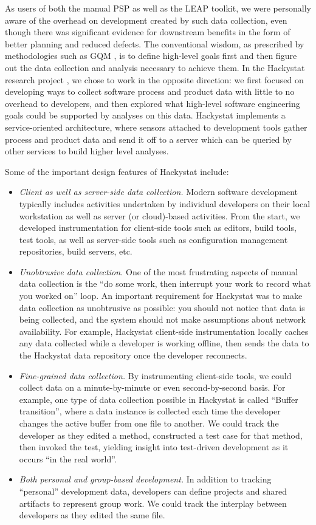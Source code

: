 \documentclass[]{article}
\begin{document}
As users of both the manual PSP as well as the LEAP toolkit, we were personally aware of
the overhead on development created by such data collection, even though there was
significant evidence for downstream benefits in the form of better planning and reduced
defects. The conventional wisdom, as prescribed by methodologies such as GQM
\cite{Basili94gqm}, is to define high-level goals first and then figure out the data
collection and analysis necessary to achieve them.  In the Hackystat research project
\cite{csdl2-02-07}, we chose to work in the opposite direction: we first focused on
developing ways to collect software process and product data with little to no overhead to
developers, and then explored what high-level software engineering goals could be
supported by analyses on this data. Hackystat implements a service-oriented architecture,
where sensors attached to development tools gather process and product data and send it
off to a server which can be queried by other services to build higher level analyses. 

Some of the important design features of Hackystat include:
\begin{itemize}
\item {\em Client as well as server-side data collection.}  Modern software development
  typically includes activities undertaken by individual developers on their local
  workstation as well as server (or cloud)-based activities. From the start, we developed
  instrumentation for client-side tools such as editors, build tools, test tools, as well
  as server-side tools such as configuration management repositories, build servers, etc.
\item {\em Unobtrusive data collection.}  One of the most frustrating aspects of manual data
  collection is the ``do some work, then interrupt your work to record what you worked on''
  loop. An important requirement for Hackystat was to make data collection as unobtrusive
  as possible: you should not notice that data is being collected, and the system should
  not make assumptions about network availability. For example, Hackystat client-side
  instrumentation locally caches any data collected while a developer is working
  offline, then sends the data to the Hackystat data repository once the developer
  reconnects. 
\item {\em Fine-grained data collection.}  By instrumenting client-side tools, we could
  collect data on a minute-by-minute or even second-by-second basis. For example, one type
  of data collection possible in Hackystat is called ``Buffer transition'', where a data
  instance is collected each time the developer changes the active buffer from one file to
  another.  We could track the developer as they edited a method, constructed a test case
  for that method, then invoked the test, yielding insight into test-driven development as
  it occurs ``in the real world''.
\item {\em Both personal and group-based development.}  In addition to tracking ``personal''
  development data, developers can define projects and shared artifacts to represent group
  work.  We could track the interplay between developers as they edited the same file. 
\end{itemize}
\end{document}
